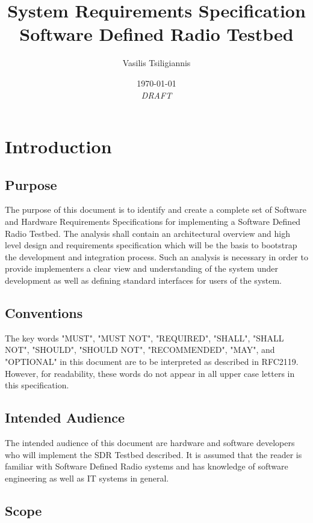 \documentclass[english,titlepage,a4paper]{report}
\title{
  System Requirements Specification \\
  \large Software Defined Radio Testbed
}
\author{Vasilis Tsiligiannis}
\date{\today\\\textit{DRAFT}}
\begin{document}
\renewcommand*{\arraystretch}{2}
\maketitle
\tableofcontents


\chapter{Introduction}
\section{Purpose}

The purpose of this document is to identify and create a complete set of Software and Hardware Requirements Specifications for implementing a Software Defined Radio Testbed.
The analysis shall contain an architectural overview and high level design and requirements specification which will be the basis to bootstrap the development and integration process.
Such an analysis is necessary in order to provide implementers a clear view and understanding of the system under development as well as defining standard interfaces for users of the system.

\section{Conventions}

The key words "MUST", "MUST NOT", "REQUIRED", "SHALL", "SHALL NOT", "SHOULD", "SHOULD NOT", "RECOMMENDED", "MAY", and "OPTIONAL" in this document are to be interpreted as described in RFC2119.
However, for readability, these words do not appear in all upper case letters in this specification.

\printglossary[type=definitions,numberedsection,style=definitions,nonumberlist]

\section{Intended Audience}

The intended audience of this document are hardware and software developers who will implement the SDR Testbed described.
It is assumed that the reader is familiar with Software Defined Radio systems and has knowledge of software engineering as well as IT systems in general.

\section{Scope}
\end{document}
